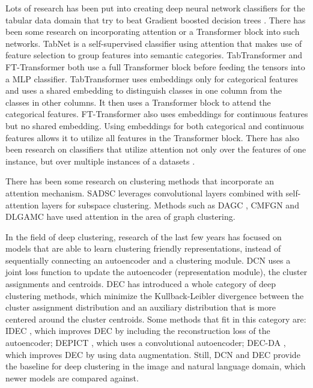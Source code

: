 Lots of research has been put into creating deep neural network classifiers for the tabular data domain that try to beat Gradient boosted decision trees \cite{deep_neural_networks_tabular_data_survey}. There has been some research on incorporating attention or a Transformer block into such networks. TabNet \cite{tabnet} is a self-supervised classifier using attention that makes use of feature selection to group features into semantic categories. TabTransformer \cite{tab_transformer} and FT-Transformer \cite{ft_transformer} both use a full Transformer block before feeding the tensors into a MLP classifier. TabTransformer uses embeddings only for categorical features and uses a shared embedding to distinguish classes in one column from the classes in other columns. It then uses a Transformer block to attend the categorical features. FT-Transformer also uses embeddings for continuous features but no shared embedding. Using embeddings for both categorical and continuous features allows it to utilize all features in the Transformer block. There has also been research on classifiers that utilize attention not only over the features of one instance, but over multiple instances of a datasets \cite{attention_between_datapoints, saint}.

There has been some research on clustering methods that incorporate an attention mechanism. SADSC \cite{sadsc} leverages convolutional layers combined with self-attention layers for subspace clustering. Methods such as DAGC \cite{dagc}, CMFGN \cite{cmfgn} and DLGAMC \cite{dlgamc} have used attention in the area of graph clustering.

In the field of deep clustering, research of the last few years has focused on models that are able to learn clustering friendly representations, instead of sequentially connecting an autoencoder and a clustering module. DCN \cite{dcn} uses a joint loss function to update the autoencoder (representation module), the cluster assignments and centroids. DEC \cite{dec} has introduced a whole category of deep clustering methods, which minimize the Kullback-Leibler divergence between the cluster assignment distribution and an auxiliary distribution that is more centered around the cluster centroids. Some methods that fit in this category are: IDEC \cite{idec}, which improves DEC by including the reconstruction loss of the autoencoder; DEPICT \cite{depict}, which uses a convolutional autoencoder; DEC-DA \cite{dec-da}, which improves DEC by using data augmentation. Still, DCN and DEC provide the baseline for deep clustering in the image and natural language domain, which newer models are compared against.

